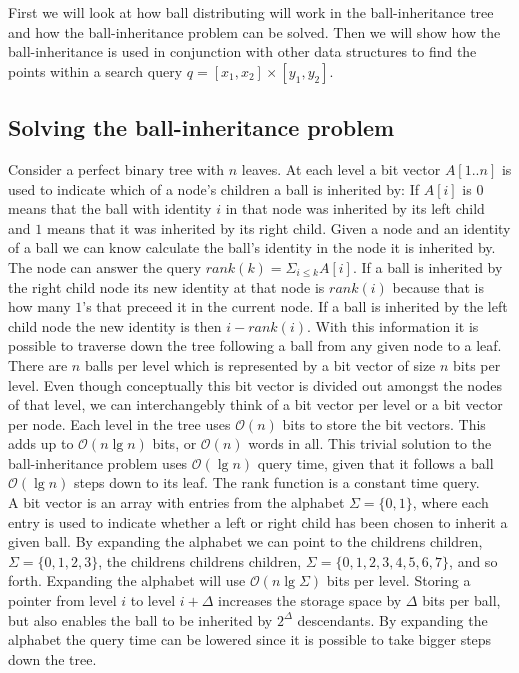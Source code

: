 First we will look at how ball distributing will work in the ball-inheritance tree and how the ball-inheritance problem can be solved. Then we will show how the ball-inheritance is used in conjunction with other data structures to find the points within a search query $q = [x_1, x_2] \times [y_1, y_2]$.

\subsection{Solving the ball-inheritance problem} 
\label{ssection:solving-ball}

Consider a perfect binary tree with $n$ leaves. At each level a bit vector $A[1..n]$ is used to indicate which of a node's children a ball is inherited by: If $A[i]$ is $0$ means that the ball with identity $i$ in that node was inherited by its left child and $1$ means that it was inherited by its right child. Given a node and an identity of a ball we can know calculate the ball's identity in the node it is inherited by. The node can answer the query $rank(k) = \Sigma_{i \leq k} A[i]$. If a ball is inherited by the right child node its new identity at that node is $rank(i)$ because that is how many $1$'s that preceed it in the current node. If a ball is inherited by the left child node the new identity is then $i-rank(i)$. With this information it is possible to traverse down the tree following a ball from any given node to a leaf. There are $n$ balls per level which is represented by a bit vector of size $n$ bits per level. Even though conceptually this bit vector is divided out amongst the nodes of that level, we can interchangebly think of a bit vector per level or a bit vector per node. Each level in the tree uses $\mathcal{O}(n)$ bits to store the bit vectors. This adds up to $\mathcal{O}(n \lg n)$ bits, or $\mathcal{O}(n)$ words in all. This trivial solution to the ball-inheritance problem uses $\mathcal{O}(\lg n)$ query time, given that it follows a ball $\mathcal{O}(\lg n)$ steps down to its leaf. The rank function is a constant time query. \\


A bit vector is an array with entries from the alphabet $\Sigma = \{0,1\}$, where each entry is used to indicate whether a left or right child has been chosen to inherit a given ball. By expanding the alphabet we can point to the childrens children, $\Sigma = \{0,1,2,3\}$, the childrens childrens children, $\Sigma = \{0,1,2,3,4,5,6,7\}$, and so forth. Expanding the alphabet will use $\mathcal{O}(n \lg \Sigma)$ bits per level. Storing a pointer from level $i$ to level $i+\Delta$ increases the storage space by $\Delta$ bits per ball, but also enables the ball to be inherited by $2^\Delta$ descendants. By expanding the alphabet the query time can be lowered since it is possible to take bigger steps down the tree. 

